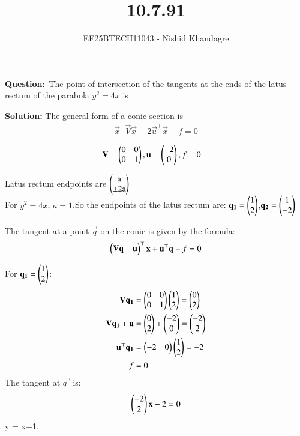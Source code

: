 \documentclass[journal]{IEEEtran}
\title{10.7.91}
\author{EE25BTECH11043 - Nishid Khandagre}
\begin{document}
\maketitle

\renewcommand{\thefigure}{\theenumi}
\renewcommand{\thetable}{\theenumi}


\textbf{Question}:\
The point of intersection of the tangents at the ends of the latus rectum of the parabola $y^2 = 4x$ is

\textbf{Solution: }
The general form of a conic section is\\
\begin{align}
\vec{x}^{\top}\vec{V}\vec{x} + 2\vec{u}^{\top}\vec{x} + f = 0
\end{align}

    \begin{align}
    \mathbf{V} &= \begin{pmatrix}0 & 0 \\ 0 & 1\end{pmatrix} , \mathbf{u}= \begin{pmatrix}-2 \\ 0\end{pmatrix} ,f= 0
    \end{align}
    
Latus rectum endpoints are $\begin{pmatrix}\text{a}\\\pm 2\text{a}\end{pmatrix}$\\
For $y^2 = 4x$, $a=1$.So the endpoints of the latus rectum are: $\mathbf{q_1} = \begin{pmatrix}1 \\ 2\end{pmatrix}$,$\mathbf{q_2} = \begin{pmatrix}1 \\ -2\end{pmatrix}$



The tangent at a point $\vec{q}$ on the conic is given by the formula:
\begin{align}
\begin{pmatrix}\mathbf{V}\mathbf{q} + \mathbf{u}\end{pmatrix}^{\top}\mathbf{x} + \mathbf{u}^{\top}\mathbf{q} + f = 0 
\end{align}

    For $\mathbf{q_1} = \begin{pmatrix}1 \\ 2\end{pmatrix}$:
    \begin{align}
    \mathbf{V}\mathbf{q_1} &= \begin{pmatrix}0 & 0 \\ 0 & 1\end{pmatrix}\begin{pmatrix}1 \\ 2\end{pmatrix} = \begin{pmatrix}0\\ 2\end{pmatrix} \\
    \mathbf{V}\mathbf{q_1} + \mathbf{u} &= \begin{pmatrix}0 \\ 2\end{pmatrix} + \begin{pmatrix}-2 \\ 0\end{pmatrix} = \begin{pmatrix}-2 \\ 2\end{pmatrix} \\
    \mathbf{u}^{\top}\mathbf{q_1} &= \begin{pmatrix}-2 & 0\end{pmatrix}\begin{pmatrix}1 \\ 2\end{pmatrix} = -2 \\
    f &= 0
    \end{align}
    The tangent at $\vec{q_1}$ is: 
    \begin{align}
    \begin{pmatrix}-2 \\ 2\end{pmatrix}\mathbf{x} - 2 = 0
    \end{align}
    y = x+1. \label{eq:tangent1}
\end{document}
